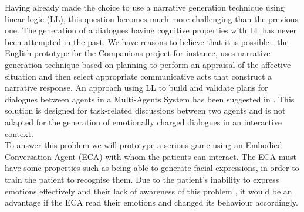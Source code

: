 \documentclass[11pt]{article}
\begin{document}
Having already made the choice to use a narrative generation technique using linear logic (LL), this question becomes much more challenging than the previous one. The generation of a dialogues having cognitive properties with LL has never been attempted in the past. We have reasons to believe that it is possible : the English prototype for the Companions project \citep{Smith11} for instance, uses narrative generation technique based on planning to perform an appraisal of the affective situation and then select appropriate communicative acts that construct a narrative response. An approach using LL to build and validate plans for dialogues between agents in a Multi-Agents System has been suggested in \citep{Dixon09}. This solution is designed for task-related discussions between two agents and is not adapted for the generation of emotionally charged dialogues in an interactive context.\\ 

To answer this problem we will prototype a serious game using an Embodied Conversation Agent (ECA) with whom the patients can interact. The ECA must have some properties such as being able to generate facial expressions, in order to train the patient to recognise them. Due to the patient's inability to express emotions effectively and their lack of awareness of this problem \citep{Peyroux14,Weiss09}, it would be an advantage if the ECA read their emotions and changed its behaviour accordingly.
\end{document}
